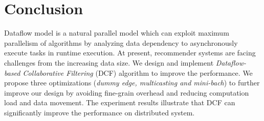 \documentclass{llncs}
\begin{document}
\vspace{-10pt}
\section{Conclusion}
\label{sec:conclusion}
\vspace{-5pt}
Dataflow model is a natural parallel model which can exploit maximum
parallelism of algorithms by analyzing data dependency to asynchronously
execute tasks in runtime execution. At present, recommender
systems are facing challenges from the increasing data size. We design and implement {\it Dataflow-based Collaborative Filtering} (DCF) algorithm to improve the performance. We propose three optimizations ({\it dummy edge, multicasting and mini-bach}) to further improve our design by avoiding fine-grain overhead and reducing computation load and data movement. The experiment results illustrate that DCF can significantly improve the performance on distributed system.

\vspace{-10pt}


\vspace{-20pt}
\end{document}
